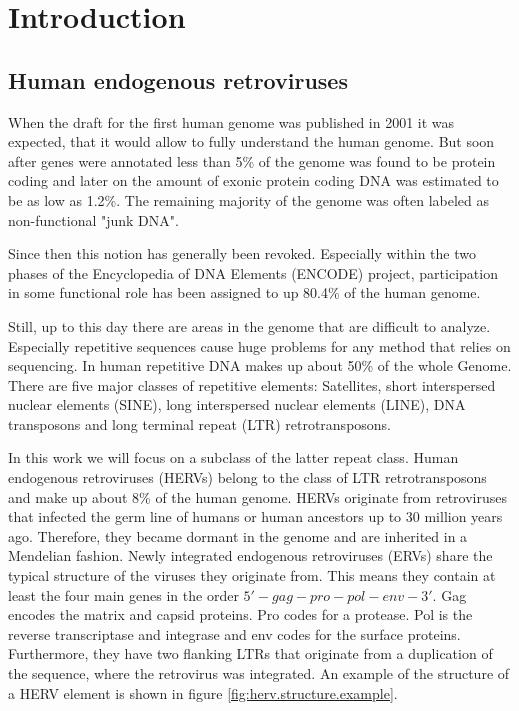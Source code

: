 \documentclass[a4paper,12pt,twoside,openright]{article}
\let\oldsection\section
\def\section{\cleardoublepage\oldsection}
\begin{document}
\newpage


\tableofcontents
\newpage


\pagestyle{plain}
\section{Introduction} 
\label{Introduction}

\subsection{Human endogenous retroviruses}
\label{Introduction:Human endogenous retroviruses}

When the draft for the first human genome was published in 2001\cite{Venter1304} it was expected, that it would allow to fully understand the human genome. But soon after genes were annotated less than 5\% of the genome was found to be protein coding\cite{Consortium2001} and later on the amount of exonic protein coding DNA was estimated to be as low as 1.2\%\cite{Encode2012}. The remaining majority of the genome was often labeled as non-functional "junk DNA"\cite{Pennisi1159}. 

Since then this notion has generally been revoked. Especially within the two phases of the Encyclopedia of DNA Elements (ENCODE) project\cite{Encode2012}, participation in some functional role has been assigned to up 80.4\% of the human genome. 

Still, up to this day there are areas in the genome that are difficult to analyze. Especially repetitive sequences cause huge problems for any method that relies on sequencing\cite{Treangen2011}. In human repetitive DNA makes up about 50\% of the whole Genome\cite{Treangen2011}. There are five major classes of repetitive elements: Satellites, short interspersed nuclear elements (SINE), long interspersed nuclear elements (LINE), DNA transposons and long terminal repeat (LTR) retrotransposons. 

In this work we will focus on a subclass of the latter repeat class. Human endogenous retroviruses (HERVs) belong to the class of LTR retrotransposons and make up about 8\% of the human genome\cite{APM:APM12476}. HERVs originate from retroviruses that infected the germ line of humans or human ancestors up to 30 million years ago\cite{10.1146/annurev.genom.7.080505.115700}. Therefore, they became dormant in the genome and are inherited in a Mendelian fashion. Newly integrated endogenous retroviruses (ERVs) share the typical structure of the viruses they originate from. This means they contain at least the four main genes in the order $5'-gag-pro-pol-env-3'$. Gag encodes the matrix and capsid proteins. Pro codes for a protease. Pol is the reverse transcriptase and integrase and env codes for the surface proteins. Furthermore, they have two flanking LTRs that originate from a duplication of the sequence, where the retrovirus was integrated\cite{10.1146/annurev.genom.7.080505.115700}. An example of the structure of a HERV element is shown in figure \ref{fig:herv.structure.example}.
\end{document}
